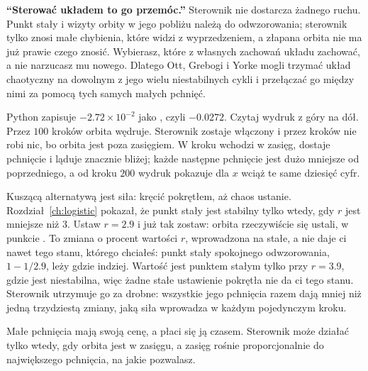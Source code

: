 \begin{trapbox}
\textbf{\enquote{Sterować układem to go przemóc.}} Sterownik nie dostarcza
żadnego ruchu. Punkt stały i wizyty orbity w jego pobliżu należą do
odwzorowania; sterownik tylko znosi małe chybienia, które widzi z
wyprzedzeniem, a złapana orbita nie ma już prawie czego znosić. Wybierasz,
które z własnych zachowań układu zachować, a nie narzucasz mu nowego.
Dlatego Ott, Grebogi i Yorke mogli trzymać układ chaotyczny na dowolnym z
jego wielu niestabilnych cykli i przełączać go między nimi za pomocą tych
samych małych pchnięć.
\end{trapbox}



\noindent
Python zapisuje $-\num{2.72} \times 10^{-2}$ jako , czyli
$-\num{0.0272}$. Czytaj wydruk z góry na dół. Przez $100$ kroków orbita
wędruje. Sterownik zostaje włączony i przez  kroków nie
robi nic, bo orbita jest poza zasięgiem. W kroku  wchodzi w
zasięg, dostaje pchnięcie i ląduje znacznie bliżej; każde następne pchnięcie
jest dużo mniejsze od poprzedniego, a od kroku $200$ wydruk pokazuje dla $x$
wciąż te same dziesięć cyfr.


Kuszącą alternatywą jest siła: kręcić pokrętłem, aż chaos ustanie.
Rozdział~\ref{ch:logistic} pokazał, że punkt stały jest stabilny tylko
wtedy, gdy $r$ jest mniejsze niż $3$. Ustaw $r = \num{2.9}$ i już tak zostaw:
orbita rzeczywiście się ustali, w punkcie . To zmiana o
 procent wartości $r$, wprowadzona na stałe, a nie daje
ci nawet tego stanu, którego chciałeś: punkt stały spokojnego odwzorowania,
$1 - 1/\num{2.9}$, leży gdzie indziej. Wartość  jest punktem
stałym tylko przy $r = \num{3.9}$, gdzie jest niestabilna, więc żadne stałe
ustawienie pokrętła nie da ci tego stanu. Sterownik utrzymuje go za drobne:
wszystkie jego pchnięcia razem dają mniej niż jedną trzydziestą zmiany,
jaką siła wprowadza w każdym pojedynczym kroku.

Małe pchnięcia mają swoją cenę, a płaci się ją czasem. Sterownik może
działać tylko wtedy, gdy orbita jest w zasięgu, a zasięg rośnie proporcjonalnie
do największego pchnięcia, na jakie pozwalasz.

